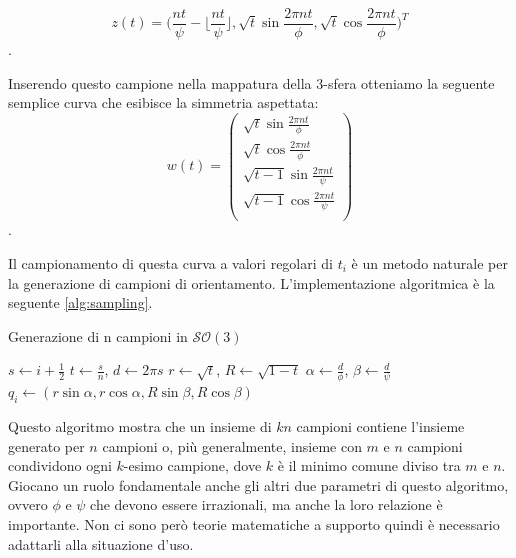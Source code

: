 $$
	z(t) = \bigg(\frac{nt}{\psi} - \biggl\lfloor\frac{nt}{\psi}\biggl\rfloor, \sqrt{t}\sin{\frac{2\pi nt}{\phi}}, \sqrt{t}\cos{\frac{2\pi nt}{\phi}}\bigg)^T
$$.

Inserendo questo campione nella mappatura della 3-sfera otteniamo la seguente semplice curva che esibisce la simmetria aspettata:
$$
w(t) = \begin{pmatrix}
	\sqrt{t}\sin{\frac{2\pi nt}{\phi}} \\
	\sqrt{t}\cos{\frac{2\pi nt}{\phi}} \\
	\sqrt{t-1}\sin{\frac{2\pi nt}{\psi}} \\
	\sqrt{t-1}\cos{\frac{2\pi nt}{\psi}} \\
\end{pmatrix}
$$.

Il campionamento di questa curva a valori regolari di $t_i$ è un metodo naturale per la generazione di campioni di orientamento. L'implementazione algoritmica è la seguente \ref{alg:sampling}.
\begin{algorithm}
	\caption{Generazione di n campioni in $\mathcal{SO}(3)$}
	\label{alg:sampling}
	\begin{algorithmic}
				 \State $s \gets i + \frac{1}{2}$
				 \State $t \gets \frac{s}{n}$, $d \gets 2\pi s$
				 \State $r \gets \sqrt{t}$, $R \gets \sqrt{1 - t}$
				 \State $\alpha \gets \frac{d}{\phi}$, $\beta \gets \frac{d}{\psi}$
				 \State $q_i \gets (r\sin{\alpha}, r\cos{\alpha}, R\sin{\beta}, R\cos{\beta})$
		    \EndFor
	    \EndFunction
	\end{algorithmic}
\end{algorithm}

Questo algoritmo mostra che un insieme di $kn$ campioni contiene l'insieme generato per $n$ campioni o, più generalmente, insieme con $m$ e $n$ campioni condividono ogni $k$-esimo campione, dove $k$ è il minimo comune diviso tra $m$ e $n$. Giocano un ruolo fondamentale anche gli altri due parametri di questo algoritmo, ovvero $\phi$ e $\psi$ che devono essere irrazionali, ma anche la loro relazione è importante. Non ci sono però teorie matematiche a supporto quindi è necessario adattarli alla situazione d'uso.
